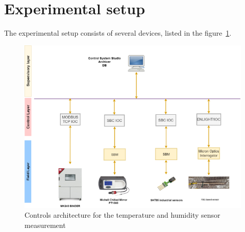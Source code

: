 \section{Experimental setup}
The experimental setup consists of several devices, listed in the figure~\ref{fig:fos_arch}. 

\begin{figure}[!h]
\centering
\includegraphics[width=0.75\columnwidth]{Chapter5/images/FOS_dcs_scheme.png}
\caption{Controls architecture for the temperature and humidity sensor measurement}
\label{fig:fos_arch}
\end{figure}


